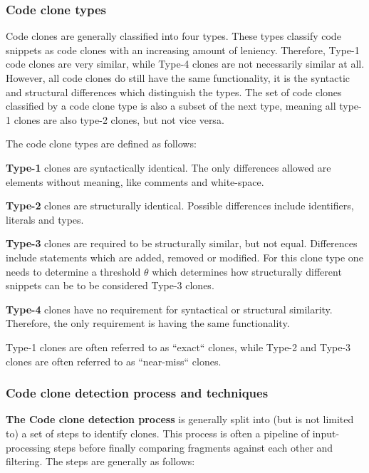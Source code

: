 \documentclass[12pt]{article}
\begin{document}
\subsubsection{Code clone types}

Code clones are generally classified into four types\cite{Inoue_introduction_to_cc}. These
types classify code snippets as code clones with an increasing amount of leniency.
Therefore, Type-1 code clones are very similar, while Type-4 clones are not necessarily
similar at all. However, all code clones do still have the same functionality, it is the
syntactic and structural differences which distinguish the types. The set of code clones
classified by a code clone type is also a subset of the next type, meaning all type-1
clones are also type-2 clones, but not vice versa.

The code clone types are defined as follows:

\textbf{Type-1} clones are syntactically identical. The only differences allowed are elements
without meaning, like comments and white-space.

\textbf{Type-2} clones are structurally identical. Possible differences include
identifiers, literals and types.

\textbf{Type-3} clones are required to be structurally similar, but not equal. Differences
include statements which are added, removed or modified. For this clone type one needs to
determine a threshold $\theta$ which determines how structurally different snippets can be
to be considered Type-3 clones\cite{Inoue_introduction_to_cc}.

\textbf{Type-4} clones have no requirement for syntactical or structural similarity. Therefore,
the only requirement is having the same functionality.

Type-1 clones are often referred to as ``exact`` clones, while Type-2 and Type-3 clones are
often referred to as ``near-miss`` clones\cite[1]{Zibran_real_time_search}.

\subsubsection{Code clone detection process and techniques}

\textbf{The Code clone detection process} is generally split into (but is not limited to)
a set of steps to identify clones\cite{ComparisonAndEvaluationOfTechniques}. This
process is often a pipeline of input-processing steps before finally comparing fragments
against each other and filtering. The steps are generally as follows:
\end{document}
